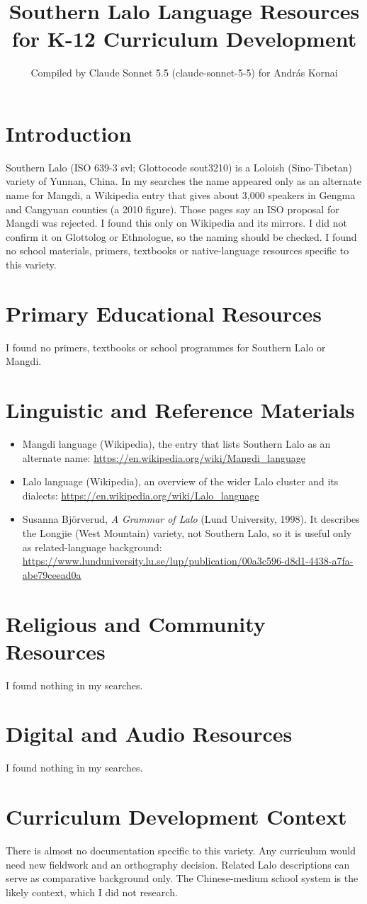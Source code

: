 \documentclass[12pt]{article}
\title{Southern Lalo Language Resources for K-12 Curriculum Development}
\author{Compiled by Claude Sonnet 5.5 (claude-sonnet-5-5) for Andr\'as Kornai}
\date{}
\begin{document}
\maketitle

\section{Introduction}
Southern Lalo (ISO 639-3 svl; Glottocode sout3210) is a Loloish (Sino-Tibetan) variety of Yunnan, China. In my searches the name appeared only as an alternate name for Mangdi, a Wikipedia entry that gives about 3,000 speakers in Gengma and Cangyuan counties (a 2010 figure). Those pages say an ISO proposal for Mangdi was rejected. I found this only on Wikipedia and its mirrors. I did not confirm it on Glottolog or Ethnologue, so the naming should be checked. I found no school materials, primers, textbooks or native-language resources specific to this variety.

\section{Primary Educational Resources}
I found no primers, textbooks or school programmes for Southern Lalo or Mangdi.

\section{Linguistic and Reference Materials}
\begin{itemize}
\item Mangdi language (Wikipedia), the entry that lists Southern Lalo as an alternate name: \url{https://en.wikipedia.org/wiki/Mangdi_language}
\item Lalo language (Wikipedia), an overview of the wider Lalo cluster and its dialects: \url{https://en.wikipedia.org/wiki/Lalo_language}
\item Susanna Bj\"orverud, \emph{A Grammar of Lalo} (Lund University, 1998). It describes the Longjie (West Mountain) variety, not Southern Lalo, so it is useful only as related-language background: \url{https://www.lunduniversity.lu.se/lup/publication/00a3c596-d8d1-4438-a7fa-abe79ceead0a}
\end{itemize}

\section{Religious and Community Resources}
I found nothing in my searches.

\section{Digital and Audio Resources}
I found nothing in my searches.

\section{Curriculum Development Context}
There is almost no documentation specific to this variety. Any curriculum would need new fieldwork and an orthography decision. Related Lalo descriptions can serve as comparative background only. The Chinese-medium school system is the likely context, which I did not research.
\end{document}
